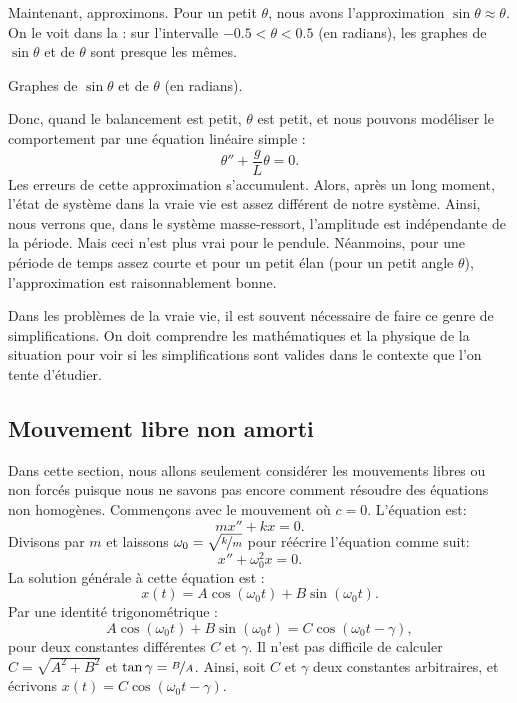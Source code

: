 Maintenant, approximons. Pour un petit $\theta$, nous avons l'approximation 
$\sin \theta \approx \theta$.  On le voit dans la :  sur l'intervalle 
$-0.5 < \theta < 0.5$ (en radians), les graphes de  $\sin \theta$ et de $\theta$ sont presque les mêmes.

\begin{mywrapfig}{3.25in}
\capstart {}
\caption{Graphes de  $\sin \theta$ et de $\theta$ (en radians).\label{mv:sinthetafig}}
\end{mywrapfig}

Donc, quand le balancement est petit,  $\theta$ est petit, et nous pouvons modéliser le comportement par une équation linéaire simple :
\begin{equation*}
	\theta'' + \frac{g}{L} \theta = 0 .
\end{equation*}
Les erreurs de cette approximation s'accumulent. Alors, après un long moment, l'état de système dans la vraie vie est assez différent de notre système. Ainsi, nous verrons que, dans le système masse-ressort,  l'amplitude est indépendante de la période. 
Mais ceci n'est plus vrai pour le pendule.  Néanmoins, pour une période de temps assez courte et pour un petit élan (pour un petit angle $\theta$), l'approximation est raisonnablement bonne. 

Dans les problèmes de la vraie vie, il est souvent nécessaire de faire ce genre de simplifications.  On doit comprendre les mathématiques et la physique de la situation pour voir si les simplifications sont valides dans le contexte que l'on tente d'étudier. 




\subsection{Mouvement libre non amorti}

Dans cette section, nous allons seulement considérer les mouvements libres ou non forcés puisque nous ne savons pas encore comment résoudre des équations non homogènes. Commençons avec le mouvement
 où $c=0$.  L'équation est: 
\begin{equation*}
	mx'' + kx = 0 .
\end{equation*}
Divisons par $m$ et laissons $\omega_0 = \sqrt{\nicefrac{k}{m}}$ pour réécrire l'équation comme suit: 
\begin{equation*}
	x'' + \omega_0^2 x = 0 .
\end{equation*}
La solution générale à cette équation est : 
\begin{equation*}
	x(t) = A \cos (\omega_0 t) + B \sin (\omega_0 t) .
\end{equation*}
Par une identité trigonométrique : 
\begin{equation*}
	A \cos (\omega_0 t) + B \sin (\omega_0 t) =
	C \cos ( \omega_0 t - \gamma ) ,
\end{equation*}
pour deux constantes différentes $C$ et $\gamma$.
Il n'est pas difficile de calculer 
$C= \sqrt{A^2 + B^2}$ et $\tan \gamma = \nicefrac{B}{A}$.  
Ainsi, soit $C$ et $\gamma$ deux constantes arbitraires, et écrivons 
$x(t) = C \cos ( \omega_0 t - \gamma )$.

